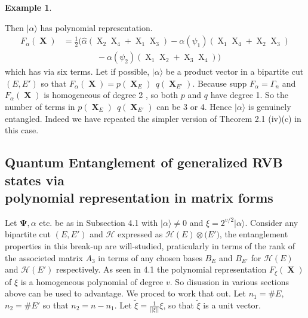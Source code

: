 \documentclass[a4paper,12pt]{article}
\DeclareMathOperator{\x}{\mathrm{X}}
\theoremstyle{definition}
\theoremstyle{underlinethm}
\newtheorem{example}{Example}[section]
\theoremstyle{definition}
\begin{document}
\begin{example}
\begin{enumerate}[label=(\alph*)]
Then $| \alpha \rangle$ has polynomial representation.
\begin{equation*}
\begin{split}
F_{\alpha}(\boldsymbol{\x}) &= \frac{1}{2} \Bigg(\hat{\alpha}\left(\x_{2} \x_{4} + \x_{1} \x_{3}\right)- \alpha \left(\psi_{1}\right) \left(\x_{1} \x_{4} + \x_{2} \x_{3} \right)\\
&\qquad\qquad - \alpha \left(\psi_{2}\right) \left(\x_{1} \x_{2} + \x_{3} \x_{4}\right) \Bigg)
\end{split}
\end{equation*}
which has via six terms. Let if possible, $| \alpha \rangle$ be a product vector in a bipartite cut $(E, E')$ so that $F_{\alpha}(\boldsymbol{\x}) = p(\boldsymbol{\x}_{E})~~ q(\boldsymbol{\x}_{E'})$. Because supp $F_{\alpha}= \Gamma_{n}$ and $F_{\alpha}(\boldsymbol{\x})$ is homogeneous of degree 2 , so both $p$ and $q$ have degree 1. So the number of terms in $p(\boldsymbol{\x}_{E})~~q(\boldsymbol{\x}_{E'})$ can be 3 or 4. Hence $| \alpha \rangle$ is genuinely entangled. Indeed we have repeated the simpler version of  Theorem  2.1 (iv)(c) in this case.
\end{enumerate}
\end{example}

\subsection{Quantum Entanglement of generalized RVB states via\\ polynomial representation in matrix forms}\label{subsection-4.2}

Let $\boldsymbol{\Psi}, \alpha$ etc. be as in Subsection 4.1 with $| \alpha \rangle \neq 0$ and $\xi = 2^{v/2} | \alpha \rangle$. Consider any bipartite cut $(E, E')$ and $\mathcal{H}$ expressed as $\mathcal{H}(E) \otimes \mathcal(E')$, the entanglement properties in this break-up are will-studied, praticularly in terms of the rank of the associeted  matrix $A_{3}$ in terms of any chosen bases $B_{E}$ and $B_{E'}$ for $\mathcal{H}(E)$ and $\mathcal{H}(E')$ respectively. As seen in 4.1 the polynomial representation $F_{\xi}(\boldsymbol{\x})$ of $\xi$ is a homogeneous polynomial of degree $v$. So disussion in various sections above can be used to advantage. We proced to work that out. Let $n_{1}=\# E$, $n_{2} = \#E'$ so that $n_{2}= n-n_{1}$. Let $\tilde{\xi} = \frac{1}{|| \xi ||} \xi $, so that $\tilde{\xi}$ is a unit vector.
\end{document}
